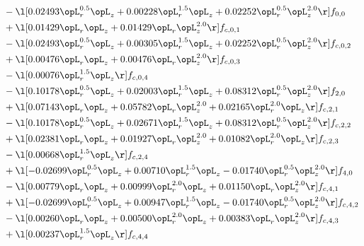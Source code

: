 \begin{alignat}{2}
& - \l[  0.02493 \opL_r^{0.5} \opL_z +  0.00228 \opL_r^{1.5} \opL_z +  0.02252 \opL_r^{0.5} \opL_z^{2.0}  \r] f_{0,0} \nonumber \\ 
& + \l[  0.01429 \opL_r \opL_z +  0.01429 \opL_r \opL_z^{2.0}  \r] f_{c,0,1} \nonumber \\ 
& - \l[  0.02493 \opL_r^{0.5} \opL_z +  0.00305 \opL_r^{1.5} \opL_z +  0.02252 \opL_r^{0.5} \opL_z^{2.0}  \r] f_{c,0,2} \nonumber \\ 
& + \l[  0.00476 \opL_r \opL_z +  0.00476 \opL_r \opL_z^{2.0}  \r] f_{c,0,3} \nonumber \\ 
& - \l[  0.00076 \opL_r^{1.5} \opL_z  \r] f_{c,0,4} \nonumber \\ 
& - \l[  0.10178 \opL_r^{0.5} \opL_z +  0.02003 \opL_r^{1.5} \opL_z +  0.08312 \opL_r^{0.5} \opL_z^{2.0}  \r] f_{2,0} \nonumber \\ 
& + \l[  0.07143 \opL_r \opL_z +  0.05782 \opL_r \opL_z^{2.0} +  0.02165 \opL_r^{2.0} \opL_z  \r] f_{c,2,1} \nonumber \\ 
& - \l[  0.10178 \opL_r^{0.5} \opL_z +  0.02671 \opL_r^{1.5} \opL_z +  0.08312 \opL_r^{0.5} \opL_z^{2.0}  \r] f_{c,2,2} \nonumber \\ 
& + \l[  0.02381 \opL_r \opL_z +  0.01927 \opL_r \opL_z^{2.0} +  0.01082 \opL_r^{2.0} \opL_z  \r] f_{c,2,3} \nonumber \\ 
& - \l[  0.00668 \opL_r^{1.5} \opL_z  \r] f_{c,2,4} \nonumber \\ 
& + \l[  -0.02699 \opL_r^{0.5} \opL_z +  0.00710 \opL_r^{1.5} \opL_z   -0.01740 \opL_r^{0.5} \opL_z^{2.0}  \r] f_{4,0} \nonumber \\ 
& - \l[  0.00779 \opL_r \opL_z +  0.00999 \opL_r^{2.0} \opL_z +  0.01150 \opL_r \opL_z^{2.0}  \r] f_{c,4,1} \nonumber \\ 
& + \l[  -0.02699 \opL_r^{0.5} \opL_z +  0.00947 \opL_r^{1.5} \opL_z   -0.01740 \opL_r^{0.5} \opL_z^{2.0}  \r] f_{c,4,2} \nonumber \\ 
& - \l[  0.00260 \opL_r \opL_z +  0.00500 \opL_r^{2.0} \opL_z +  0.00383 \opL_r \opL_z^{2.0}  \r] f_{c,4,3} \nonumber \\ 
& + \l[  0.00237 \opL_r^{1.5} \opL_z  \r] f_{c,4,4} \nonumber \\ 
\end{alignat} 


